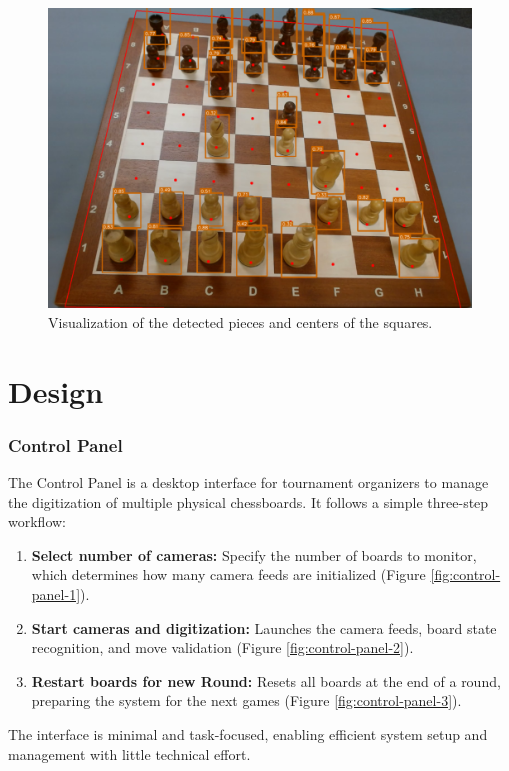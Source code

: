 \begin{figure}[h!]
    \centering
    \includegraphics[width=0.75\linewidth]{figures/methods/ml-models/piece-model.png}
    \caption[Visualization of piece model and corner model]{Visualization of the detected pieces and centers of the squares.}
    \label{fig:websocket-vs-http}
\end{figure}

\section{Design}
\label{subsec:wireframe}

\subsubsection*{Control Panel}

The Control Panel is a desktop interface for tournament organizers to manage the digitization of multiple physical chessboards. It follows a simple three-step workflow:

\begin{enumerate}
\item \textbf{Select number of cameras:} Specify the number of boards to monitor, which determines how many camera feeds are initialized (Figure \ref{fig:control-panel-1}).
\item \textbf{Start cameras and digitization:} Launches the camera feeds, board state recognition, and move validation (Figure \ref{fig:control-panel-2}).
\item \textbf{Restart boards for new Round:} Resets all boards at the end of a round, preparing the system for the next games (Figure \ref{fig:control-panel-3}).
\end{enumerate}

The interface is minimal and task-focused, enabling efficient system setup and management with little technical effort. \\


